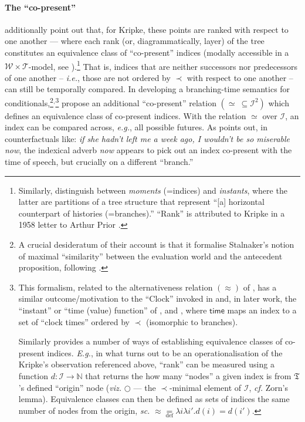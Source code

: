 \documentclass[12pt,dvipsnames]{report}
\begin{document}
\paragraph{The ``co-present''} \citet{Øhrstrøm2020} additionally point out that, for Kripke, these points are ranked with respect to one another --- where each rank (or, diagrammatically, layer) of the tree constitutes an equivalence class of ``co-present'' indices (modally accessible in a $ \mathcal{W\times T }$-model, see \citealp*[95]{Kaufmann2006}).\footnote{Similarly, \citet[194\textit{ff}]{Belnap2001a} distinguish between \textit{moments} (=indices) and \textit{instants}, where the latter are partitions of a tree structure that represent ``[a] horizontal counterpart of histories (=branches).'' ``Rank'' is attributed to Kripke in a 1958 letter to Arthur Prior \citep[published in][373\textit{ff}]{Ploug2012}.} 
That is, indices that are neither successors nor predecessors of one another -- \textit{i.e.}, those are not ordered by $ \prec $ with respect to one another -- can still be temporally compared. In developing a branching-time semantics for conditionals,\footnote{A crucial desideratum of their account is that it formalise Stalnaker's notion of maximal ``similarity'' between the evaluation world and the antecedent proposition, following \citealp{Stalnaker1968,Stalnaker1970}.}$ ^, $\footnote{This formalism, related to the alternativeness relation $ (\approx )$ of \citet[149]{Thomason1984}, has a similar outcome/motivation to the ``Clock'' invoked in \citet{Dowty1977,Thomason1981} and, in later work, the ``instant'' or ``time (value) function'' of \citet[27]{Rumberg2016a}, \citet[195]{Belnap2001a} and \citet[592]{VonPrince2019}, where $ \mathit{\mathsf{time}}$ maps an index to a set of ``clock times'' ordered by $ \prec $ (isomorphic to branches).
	
	Similarly \citet[102]{Landman1991} provides a number of ways of establishing equivalence classes of co-present indices. \textit{E.g.}, in what turns out to be an operationalisation of the Kripke's observation referenced above, ``rank'' can be measured using a function $ d:\mathcal I\to\mathbb N $ that returns the how many ``nodes'' a given index is from $ \mathfrak T $'s defined ``origin'' node (\textit{viz.} $ \bigcirc $ --- the $ \prec $-minimal element of $ \mathcal I $, \textit{cf.} Zorn's lemma). Equivalence classes can then be defined as sets of indices the same number of nodes from the origin, \textit{sc. }$ \approx\underset{\text{def}}{=}\lambda i\lambda i'.d(i)=d(i') $.} 
\cite{Thomason1980} propose an additional ``co-present'' relation $( \boldsymbol\simeq\ \subseteq\mathcal I^2) $ which defines an equivalence class of co-present indices. With the relation $ \simeq $ over $ \mathcal I $, an index can be compared across, \textit{e.g.}, all possible futures. As \citet[101]{Landman1991} points out, in counterfactuals like: \textit{if she hadn't left me a week ago, I wouldn't be so miserable now}, the indexical adverb \textit{now} appears to pick out an index co-present with the time of speech, but crucially on a different ``branch.'' %
\end{document}
